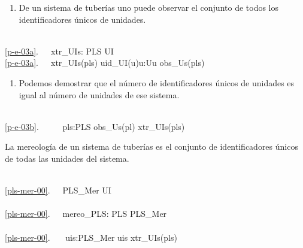 \mnewfoil
\begin{enumerate}\setei
\item \label{p-e-03a} De un sistema de tuberías uno puede observar 
el conjunto de todos los identificadores únicos de unidades.
\savei\end{enumerate}


\bp
\>\ \\
\ref{p-e-03a}.\ \ \ xtr\_UIs: PLS {\RIGHTARROW} UI\\
\ref{p-e-03a}.\ \ \ xtr\_UIs(pls) {\IS} {\LBRACE}uid\_UI(u){\BAR}u:U{\RDOT}u {\ISIN} obs\_Us(pls){\RBRACE}
\ep

\begin{enumerate}\setei
\item \label{p-e-03b} Podemos demostrar que el número de identificadores
                      únicos de unidades es igual al número de unidades de ese sistema.
\savei\end{enumerate}


\bp
\>\ \\
\ref{p-e-03b}.\ \ \ \ \ {\ALL} pls:PLS{\RDOT} obs\_Us(pl){\EQ} xtr\_UIs(pls)
\ep

\label{PLS Mereology}\LLLL\HHHH


\item \label{pls-mer-00} La mereología de un sistema de tuberías es el 
  conjunto de identificadores únicos de todas las unidades del sistema.
\begin{enumerate}\setei
\savei\end{enumerate}

\bp
{}\\
\ref{pls-mer-00}.\ \ \ PLS\_Mer {\EQ} UI\\
\\
\ref{pls-mer-00}.\ \ \ mereo\_PLS: PLS {\RIGHTARROW} PLS\_Mer\\
\\
\ref{pls-mer-00}.\ \ \ {\ALL} uis:PLS\_Mer {\RDOT} uis {\EQ}  xtr\_UIs(pls)
\ep

